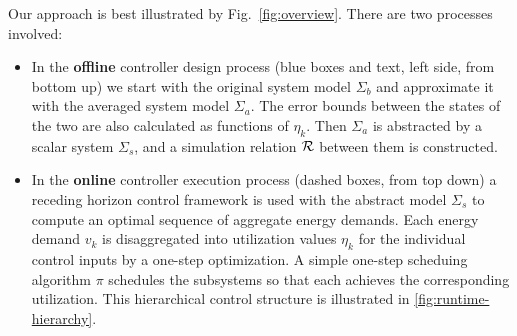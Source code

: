 Our approach is best illustrated by Fig.~\ref{fig:overview}.
There are two processes involved:
\begin{itemize}
\item In the \textbf{offline} controller design process (blue boxes and text, left side, from bottom
  up) we start with the original system model
  $\Sigma_b$ and approximate it with the averaged system model $\Sigma_a$. The
  error bounds between the states of the two are also calculated as functions
  of $\eta_k$. Then $\Sigma_a$ is abstracted by a scalar system $\Sigma_s$,
  and a simulation relation $\mathcal{R}$ between them is constructed.
  
\item In the \textbf{online} controller execution process (dashed
  boxes, from top down) a receding horizon control
  framework is used with the abstract model $\Sigma_s$ to compute an
  optimal sequence of aggregate energy demands. Each energy demand
  $v_k$ is disaggregated into utilization values $\eta_k$ for the
  individual control inputs by a one-step optimization. A simple
  one-step scheduing algorithm $\pi$ schedules the subsystems so that
  each achieves the corresponding utilization.  This hierarchical control structure is illustrated in \cref{fig:runtime-hierarchy}.
\end{itemize}


